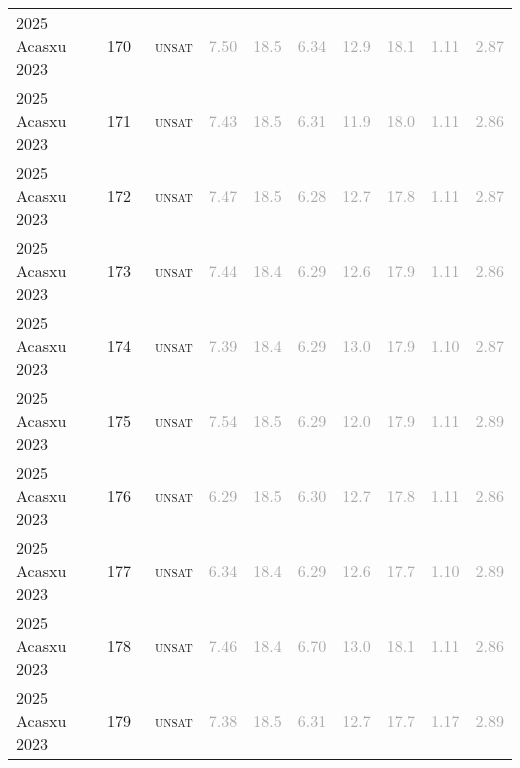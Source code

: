 \begin{center}
{\begin{longtable}{@{}llllllllll@{}}
2025 Acasxu 2023 & 170 & ~\textsc{unsat} & \textcolor{darkgray}{7.50} & \textcolor{darkgray}{18.5} & \textcolor{darkgray}{6.34} & \textcolor{darkgray}{12.9} & \textcolor{darkgray}{18.1} & \textcolor{darkgray}{1.11} & \textcolor{darkgray}{2.87} \\
2025 Acasxu 2023 & 171 & ~\textsc{unsat} & \textcolor{darkgray}{7.43} & \textcolor{darkgray}{18.5} & \textcolor{darkgray}{6.31} & \textcolor{darkgray}{11.9} & \textcolor{darkgray}{18.0} & \textcolor{darkgray}{1.11} & \textcolor{darkgray}{2.86} \\
2025 Acasxu 2023 & 172 & ~\textsc{unsat} & \textcolor{darkgray}{7.47} & \textcolor{darkgray}{18.5} & \textcolor{darkgray}{6.28} & \textcolor{darkgray}{12.7} & \textcolor{darkgray}{17.8} & \textcolor{darkgray}{1.11} & \textcolor{darkgray}{2.87} \\
2025 Acasxu 2023 & 173 & ~\textsc{unsat} & \textcolor{darkgray}{7.44} & \textcolor{darkgray}{18.4} & \textcolor{darkgray}{6.29} & \textcolor{darkgray}{12.6} & \textcolor{darkgray}{17.9} & \textcolor{darkgray}{1.11} & \textcolor{darkgray}{2.86} \\
2025 Acasxu 2023 & 174 & ~\textsc{unsat} & \textcolor{darkgray}{7.39} & \textcolor{darkgray}{18.4} & \textcolor{darkgray}{6.29} & \textcolor{darkgray}{13.0} & \textcolor{darkgray}{17.9} & \textcolor{darkgray}{1.10} & \textcolor{darkgray}{2.87} \\
2025 Acasxu 2023 & 175 & ~\textsc{unsat} & \textcolor{darkgray}{7.54} & \textcolor{darkgray}{18.5} & \textcolor{darkgray}{6.29} & \textcolor{darkgray}{12.0} & \textcolor{darkgray}{17.9} & \textcolor{darkgray}{1.11} & \textcolor{darkgray}{2.89} \\
2025 Acasxu 2023 & 176 & ~\textsc{unsat} & \textcolor{darkgray}{6.29} & \textcolor{darkgray}{18.5} & \textcolor{darkgray}{6.30} & \textcolor{darkgray}{12.7} & \textcolor{darkgray}{17.8} & \textcolor{darkgray}{1.11} & \textcolor{darkgray}{2.86} \\
2025 Acasxu 2023 & 177 & ~\textsc{unsat} & \textcolor{darkgray}{6.34} & \textcolor{darkgray}{18.4} & \textcolor{darkgray}{6.29} & \textcolor{darkgray}{12.6} & \textcolor{darkgray}{17.7} & \textcolor{darkgray}{1.10} & \textcolor{darkgray}{2.89} \\
2025 Acasxu 2023 & 178 & ~\textsc{unsat} & \textcolor{darkgray}{7.46} & \textcolor{darkgray}{18.4} & \textcolor{darkgray}{6.70} & \textcolor{darkgray}{13.0} & \textcolor{darkgray}{18.1} & \textcolor{darkgray}{1.11} & \textcolor{darkgray}{2.86} \\
2025 Acasxu 2023 & 179 & ~\textsc{unsat} & \textcolor{darkgray}{7.38} & \textcolor{darkgray}{18.5} & \textcolor{darkgray}{6.31} & \textcolor{darkgray}{12.7} & \textcolor{darkgray}{17.7} & \textcolor{darkgray}{1.17} & \textcolor{darkgray}{2.89} \\

\end{longtable}}
\end{center}
